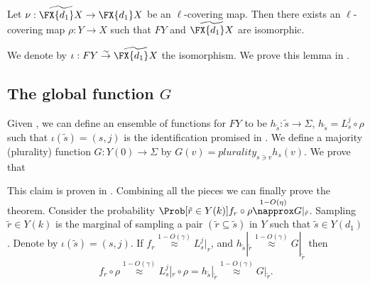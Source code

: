 \begin{lemma} \label{lem:Y-is-an-honest-to-god-cover-of-X}
    Let \(\nu:\widetilde{\FX{d_1}X} \to \FX{d_1}X\) be an \(\ell\)-covering map. Then there exists an \(\ell\)-covering map \(\rho:Y \to X\) such that \(FY\) and \(\widetilde{\FX{d_1}X}\) are isomorphic.
\end{lemma}
\begin{center}
\end{center}
%
We denote by \(\iota: FY \overset{\sim}{\to} \widetilde{\FX{d_1}X}\) the isomorphism. We prove this lemma in .
%
%
%
\subsection[The global function G]{The global function \(G\)}\label{sec:globalfunc}
Given , we can define an ensemble of functions for \(FY\) to be \(h_{\tilde{s}}:\tilde{s} \to \Sigma\), \(h_{\tilde{s}}=L_s^j\circ \rho\) such that \(\iota(\tilde{s}) =(s,j)\) is the identification promised in . We define a majority (plurality) function \(G:Y(0) \to \Sigma\) by \(G(v) = plurality_{s \ni v} h_s(v)\). We prove that
\begin{claim} 
\end{claim}

This claim is proven in . Combining all the pieces we can finally prove the theorem. Consider the probability \(\Prob[\tilde{r} \in Y(k)]{f_{r}\circ \rho \overset{1-O(\eta)}{\napprox} G|_{\tilde{r}}}\). Sampling \(\tilde{r} \in Y(k)\) is the marginal of sampling a pair \((\tilde{r} \subseteq \tilde{s})\) in \(Y\) such that \(\tilde{s} \in Y(d_1)\). Denote by \(\iota(\tilde{s})=(s,j)\). If \(f_r \overset{1-O(\gamma)}{\approx} L_s^j|_{r}\), and \(h_{\tilde{s}}|_{\tilde{r}} \overset{1-O(\gamma)}{\approx} G|_{\tilde{r}}\) then
\[f_r \circ \rho \overset{1-O(\gamma)}{\approx} L_s^j|_{r} \circ \rho = h_{\tilde{s}}|_{\tilde{r}} \overset{1-O(\gamma)}{\approx} G|_{\tilde{r}}.\]

